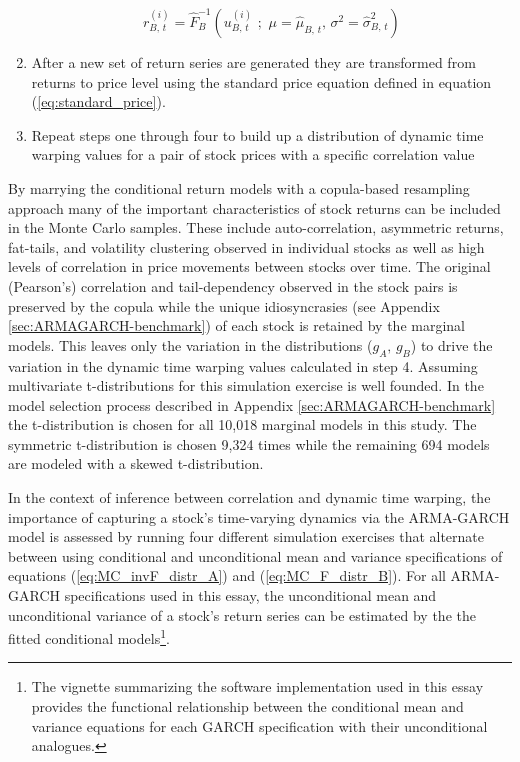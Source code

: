 \documentclass[12pt]{report}
\begin{document}
\begin{enumerate}
\begin{equation}
    \end{equation}
    \begin{equation} \label{eq:MC_invF_distr_B}
        r^{(i)}_{B,\,t} = \hat{F}^{-1}_{B} \left(u^{(i)}_{B,\,t}\,\,;\,\, \mu=\hat{\mu}_{B,\,t},\, \sigma^{2}=\hat{\sigma}^{2}_{B,\,t} \right)
    \end{equation} 
    \item After a new set of return series are generated they are transformed from returns to price level using the standard price equation defined in equation (\ref{eq:standard_price}).
    \item Repeat steps one through four to build up a distribution of dynamic time warping values for a pair of stock prices with a specific correlation value
\end{enumerate}

By marrying the conditional return models with a copula-based resampling approach many of the important characteristics of stock returns can be included in the Monte Carlo samples. These include auto-correlation, asymmetric returns, fat-tails, and volatility clustering observed in individual stocks as well as high levels of correlation in price movements between stocks over time. The original (Pearson's) correlation and tail-dependency observed in the stock pairs is preserved by the copula while the unique idiosyncrasies (see Appendix \ref{sec:ARMAGARCH-benchmark}) of each stock is retained by the marginal models. This leaves only the variation in the distributions ($g_{A},\,g_{B}$) to drive the variation in the dynamic time warping values calculated in step 4. Assuming multivariate t-distributions for this simulation exercise is well founded. In the model selection process described in Appendix \ref{sec:ARMAGARCH-benchmark} the t-distribution is chosen for all 10,018 marginal models in this study. The symmetric t-distribution is chosen 9,324 times while the remaining 694 models are modeled with a skewed t-distribution.

In the context of inference between correlation and dynamic time warping, the importance of capturing a stock's time-varying dynamics via the ARMA-GARCH model is assessed by running four different simulation exercises that alternate between using conditional and unconditional mean and variance specifications of equations (\ref{eq:MC_invF_distr_A}) and (\ref{eq:MC_F_distr_B}). For all ARMA-GARCH specifications used in this essay, the unconditional mean and unconditional variance of a stock's return series can be estimated by the the fitted conditional models\footnote{The vignette \cite{Rugarch} summarizing the software implementation used in this essay provides the functional relationship between the conditional mean and variance equations for each GARCH specification with their unconditional analogues.}.
\end{document}
